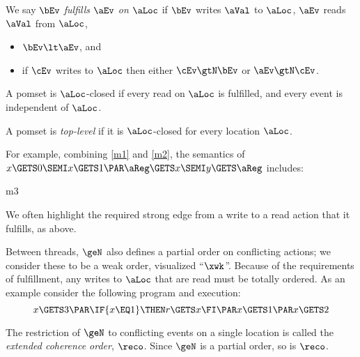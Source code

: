 \begin{definition}
  \label{def:rf}
  We say $\bEv$ \emph{fulfills $\aEv$ on $\aLoc$} if $\bEv$ \externally writes
  $\aVal$ to $\aLoc$, $\aEv$ \externally reads $\aVal$ from $\aLoc$,
  \begin{itemize}
  \item $\bEv \lt \aEv$, and

  \item if $\cEv$ \externally writes to $\aLoc$ then either $\cEv \gtN \bEv$ or $\aEv \gtN \cEv$.
  \end{itemize}

  A pomset is $\aLoc$-closed if every \external read on $\aLoc$ is fulfilled,
  and every event is independent of $\aLoc$.

  A pomset is \emph{top-level} if it is $\aLoc$-closed for every location $\aLoc$.
\end{definition}

For example, combining \eqref{m1} and \eqref{m2}, the semantics of
\begin{math}
  x\GETS 0\SEMI
  x\GETS 1
  \PAR
  \aReg\GETS x\SEMI
  y\GETS \aReg
\end{math}
includes:
\begin{tikzdisplaylabel}[node distance=1em]{m3}
\end{tikzdisplaylabel}
We often highlight the required strong edge from a write to a read action that it
fulfills, as above.

Between threads, $\geN$ also defines a partial order on conflicting actions;
we consider these to be a weak order, visualized ``$\xwk$''.
Because of the requirements of fulfillment, any writes to $\aLoc$ that are
read must be totally ordered.  As an example consider the following program
and execution:
\begin{displaymath}
  x\GETS 3
  \PAR
  \IF{x\EQ1}\THEN r\GETS x \FI
  \PAR
  x\GETS 1
  \PAR
  x\GETS2
\end{displaymath}
\begin{tikzdisplay}[node distance=1em]
\end{tikzdisplay}
The restriction of $\geN$ to conflicting events on a single location is called the \emph{extended coherence order}, $\reco$.  Since $\geN$ is a partial order, so is $\reco$.  

